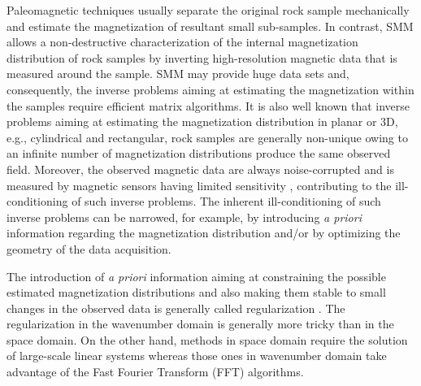 \documentclass[draft,gc]{agutex}
\begin{document}
\begin{article}
Paleomagnetic techniques usually separate the original 
rock sample mechanically and estimate the magnetization 
of resultant small sub-samples.
In contrast, SMM allows a non-destructive characterization
of the internal magnetization distribution of rock samples
by inverting high-resolution magnetic data that is measured
around the sample.
SMM may provide huge data sets and, 
consequently, the inverse problems aiming at estimating the
magnetization within the samples require efficient matrix 
algorithms.
It is also well known that inverse problems aiming at
estimating the magnetization distribution in planar or
3D, e.g., cylindrical and rectangular, rock samples are generally 
non-unique owing to an infinite number of magnetization distributions 
produce the same observed field.
Moreover, the observed magnetic data are always noise-corrupted
and is measured by magnetic sensors having limited
sensitivity \citep{egli2000, baratchart2013, lima2013},
contributing to the ill-conditioning of such inverse problems.
The inherent ill-conditioning of such inverse 
problems can be narrowed, for example, by introducing \textit{a priori} 
information regarding the magnetization distribution and/or by 
optimizing the geometry of the data acquisition.

The introduction of \textit{a priori} information aiming at constraining 
the possible estimated magnetization distributions and also 
making them stable to small changes in the observed data is
generally called regularization \citep{tikhonov1977, engl1996, 
aster2005}.
The regularization in the wavenumber domain is generally more
tricky than in the space domain.
On the other hand, methods in space domain require the solution
of large-scale linear systems whereas those ones in wavenumber
domain take advantage of the Fast Fourier Transform (FFT)
algorithms.


\end{article}
\end{document}
